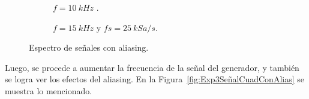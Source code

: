       \begin{figure}[H]
        \centering
        \begin{subfigure}[H]{0.48\textwidth}
          \caption{$f=10~kHz$ .}
          \label{fig:Exp3SeñalCuadEnTiempo}
        \end{subfigure}
        \hfill 
        \begin{subfigure}[H]{0.48\textwidth}
          \caption{$f=15~kHz$ y $fs=25~kSa/s$.}
          \label{fig:Exp3EspectroSeñalCuad}
        \end{subfigure}

        \caption{Espectro de señales con aliasing.}
        \label{fig:Exp3SeñalCuad10k}
      \end{figure}

      Luego, se procede a aumentar la frecuencia de la señal del generador, y también se logra ver los efectos
      del aliasing. En la Figura~\ref{fig:Exp3SeñalCuadConAlias} se muestra lo mencionado.

